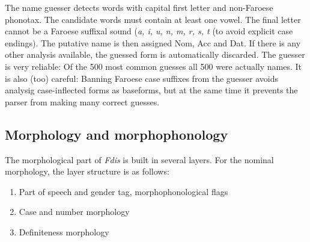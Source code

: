 \documentclass{article}
\begin{document}
The name guesser detects words with capital first letter and non-Faroese phonotax. The candidate words must contain at least one vowel. The final letter cannot be a Faroese suffixal sound (\textit{a, i, u, n, m, r, s, t} (to avoid explicit case endings). The putative name is then assigned Nom, Acc and Dat. If there is any other analysis available, the guessed form is automatically discarded. The guesser is very reliable: Of the 500 most common guesses all 500 were actually names. It is also (too) careful: Banning Faroese case suffixes from the guesser avoids analysig case-inflected forms as baseforms, but at the same time it prevents the parser from making many correct guesses. 


\subsection{Morphology and morphophonology}

The morphological part of \textit{Fdis} is built in several layers. For the nominal morphology, the layer structure is as follows:

\begin{enumerate}
\item Part of speech and gender tag, morphophonological flags
\item Case and number morphology
\item Definiteness morphology
\end{enumerate}
\end{document}

